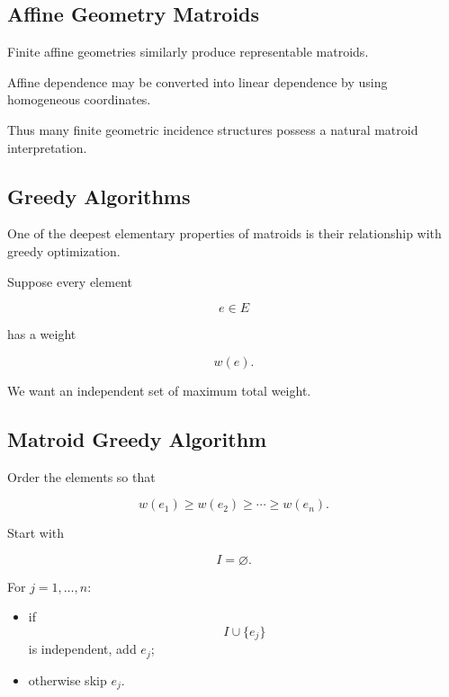 \subsection{Affine Geometry Matroids}
\label{subsec:affine-geometry-matroids}

Finite affine geometries similarly produce representable matroids.

Affine dependence may be converted into linear dependence by using
homogeneous coordinates.

Thus many finite geometric incidence structures possess a natural
matroid interpretation.

\subsection{Greedy Algorithms}
\label{subsec:matroid-greedy}

One of the deepest elementary properties of matroids is their
relationship with greedy optimization.

Suppose every element

\[
e\in E
\]

has a weight

\[
w(e).
\]

We want an independent set of maximum total weight.

\subsection{Matroid Greedy Algorithm}
\label{subsec:matroid-greedy-algorithm}

Order the elements so that

\[
w(e_1)\geq w(e_2)\geq\cdots\geq w(e_n).
\]

Start with

\[
I=\varnothing.
\]

For \(j=1,\ldots,n\):

\begin{itemize}
    \item if
    \[
    I\cup\{e_j\}
    \]
    is independent, add \(e_j\);
    \item otherwise skip \(e_j\).
\end{itemize}


